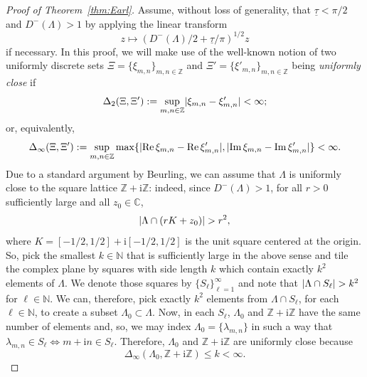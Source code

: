 \documentclass{article}
\newcommand{\bbC}{\mathbb{C}}
\newcommand{\bbN}{\mathbb{N}}
\newcommand{\bbZ}{\mathbb{Z}}
\newcommand{\rmi}{\mathrm{i}}
\DeclarePairedDelimiter{\abs}{\lvert}{\rvert}
\renewcommand{\Re}{\operatorname{Re}}
\renewcommand{\Im}{\operatorname{Im}}
\theoremstyle{remark}
\begin{document}
    \begin{proof}[Proof of Theorem~\ref{thm:Earl}]
        Assume, without loss of generality, that $\underline \tau < \pi/2$ and $D^{-}(\Lambda) > 1$ by applying the linear transform 
        \begin{equation*}
            z \mapsto (D^{-}(\Lambda)/2 + \underline \tau/\pi)^{1/2} z
        \end{equation*}
        if necessary. In this proof, we will make use of the well-known notion of two uniformly discrete sets $\Xi = \lbrace \xi_{m,n} \rbrace_{m,n \in \bbZ}$ and $\Xi' = \lbrace \xi'_{m,n} \rbrace_{m,n \in \bbZ}$ being \emph{uniformly close} if 
        \begin{equation*}
            \Delta_2(\Xi,\Xi') := \sup_{m,n \in \bbZ} \abs{\xi_{m,n} - \xi'_{m,n}} < \infty;
        \end{equation*}
        or, equivalently, 
        \begin{equation*}
            \Delta_\infty(\Xi,\Xi') := \sup_{m,n \in \bbZ} \max\lbrace \abs{\Re \xi_{m,n} - \Re \xi'_{m,n}}, \abs{\Im \xi_{m,n} - \Im \xi'_{m,n}} \rbrace < \infty.
        \end{equation*}
        Due to a standard argument by Beurling, we can assume that $\Lambda$ is uniformly close to the square lattice $\bbZ + \rmi \bbZ$: indeed, since $D^{-}(\Lambda) > 1$, for all $r > 0$ sufficiently large and all $z_0 \in \bbC$, 
        \begin{equation*}
            \abs{\Lambda \cap (r K + z_0)} > r^2,
        \end{equation*}
        where $K = [-1/2,1/2] + \rmi [-1/2,1/2]$ is the unit square centered at the origin. So, pick the smallest $k \in \bbN$ that is sufficiently large in the above sense and tile the complex plane by squares with side length $k$ which contain exactly $k^2$ elements of $\Lambda$. We denote those squares by $\lbrace S_\ell \rbrace_{\ell=1}^\infty$ and note that $\abs{\Lambda \cap S_\ell} > k^2$ for $\ell \in \bbN$. We can, therefore, pick exactly $k^2$ elements from $\Lambda \cap S_\ell$, for each $\ell \in \bbN$, to create a subset $\Lambda_0 \subset \Lambda$. Now, in each $S_\ell$, $\Lambda_0$ and $\bbZ + \rmi \bbZ$ have the same number of elements and, so, we may index $\Lambda_0 = \lbrace \lambda_{m,n} \rbrace$ in such a way that $\lambda_{m,n} \in S_\ell \iff m+\rmi n \in S_\ell$. Therefore, $\Lambda_0$ and $\bbZ + \rmi \bbZ$ are uniformly close because 
        \begin{equation*}
            \Delta_\infty(\Lambda_0,\bbZ + \rmi \bbZ) \leq k < \infty.
        \end{equation*}


\end{proof}
\end{document}
